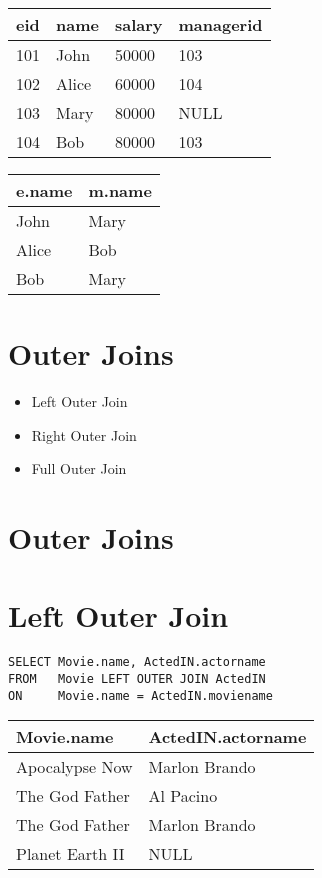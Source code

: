 \documentclass{article}
\begin{document}
\begin{tabular}{llll}
\hline
eid & name & salary & managerid \\
\hline
101 & John & 50000 & 103 \\
102 & Alice & 60000 & 104 \\
103 & Mary & 80000 & NULL \\
104 & Bob & 80000 & 103 \\
\hline
\end{tabular}

\begin{tabular}{ll}
\hline
e.name & m.name \\
\hline
John & Mary \\
Alice & Bob \\
Bob & Mary \\
\hline
\end{tabular}

\section*{Outer Joins}
\begin{itemize}
    \item Left Outer Join
    \item Right Outer Join
    \item Full Outer Join
\end{itemize}

\section*{Outer Joins}

\section*{Left Outer Join}
\begin{verbatim}
SELECT Movie.name, ActedIN.actorname
FROM   Movie LEFT OUTER JOIN ActedIN
ON     Movie.name = ActedIN.moviename
\end{verbatim}

\begin{tabular}{ll}
\hline
Movie.name & ActedIN.actorname \\
\hline
Apocalypse Now & Marlon Brando \\
The God Father & Al Pacino \\
The God Father & Marlon Brando \\
Planet Earth II & NULL \\
\hline
\end{tabular}
\end{document}
